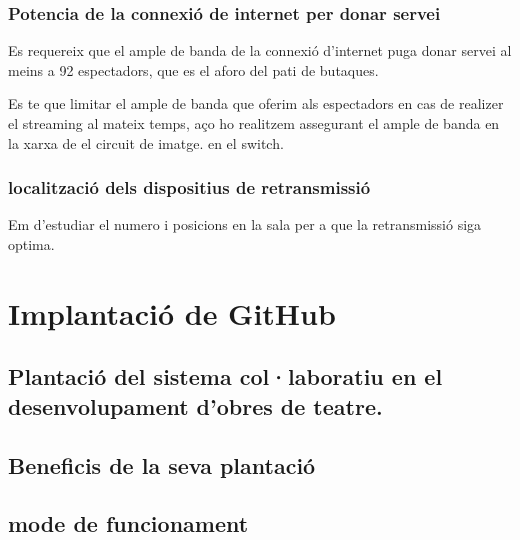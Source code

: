 \documentclass[
  10pt,
]{book}
\begin{document}
\hypertarget{potencia-de-la-connexiuxf3-de-internet-per-donar-servei}{%
\subsection{Potencia de la connexió de internet per donar servei}\label{potencia-de-la-connexiuxf3-de-internet-per-donar-servei}}

Es requereix que el ample de banda de la connexió d'internet puga donar servei al meins a 92 espectadors, que es el aforo del pati de butaques.

Es te que limitar el ample de banda que oferim als espectadors en cas de realizer el streaming al mateix temps, aço ho realitzem assegurant el ample de banda en la xarxa de el circuit de imatge. en el switch.

\hypertarget{localitzaciuxf3-dels-dispositius-de-retransmissiuxf3}{%
\subsection{localització dels dispositius de retransmissió}\label{localitzaciuxf3-dels-dispositius-de-retransmissiuxf3}}

Em d'estudiar el numero i posicions en la sala per a que la retransmissió siga optima.

\hypertarget{implantaciuxf3-de-github}{%
\chapter{Implantació de GitHub}\label{implantaciuxf3-de-github}}

\hypertarget{plantaciuxf3-del-sistema-collaboratiu-en-el-desenvolupament-dobres-de-teatre.}{%
\section{Plantació del sistema col·laboratiu en el desenvolupament d'obres de teatre.}\label{plantaciuxf3-del-sistema-collaboratiu-en-el-desenvolupament-dobres-de-teatre.}}

\hypertarget{beneficis-de-la-seva-plantaciuxf3}{%
\section{Beneficis de la seva plantació}\label{beneficis-de-la-seva-plantaciuxf3}}

\hypertarget{mode-de-funcionament}{%
\section{mode de funcionament}\label{mode-de-funcionament}}
\end{document}
